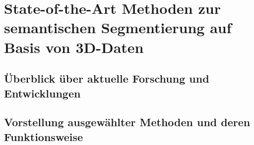 \chapter{State-of-the-Art Methoden zur semantischen Segmentierung auf Basis von 3D-Daten}
\section{Überblick über aktuelle Forschung und Entwicklungen}
\section{Vorstellung ausgewählter Methoden und deren Funktionsweise}
